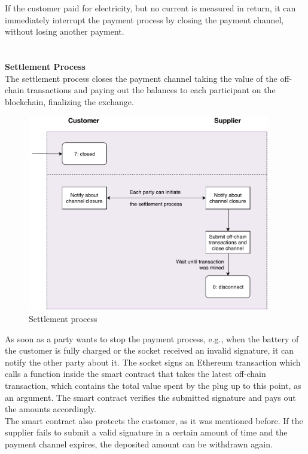 If the customer paid for electricity, but no current is measured in return, it can immediately interrupt the payment process by closing the payment channel, without losing another payment.
\\\\\\
\textbf{Settlement Process}\\
The settlement process closes the payment channel taking the value of the off-chain transactions and paying out the balances to each participant on the blockchain, finalizing the exchange.
\begin{figure}[H]
  \begin{center}
    \includegraphics[height=8.6cm]{img/Plug-Socket-settlement_process.pdf}
    \caption{Settlement process}
    \label{fig:settlement_process}
  \end{center}
\end{figure}
As soon as a party wants to stop the payment process, e.g., when the battery of the customer is fully charged or the socket received an invalid signature, it can notify the other party about it.
The socket signs an Ethereum transaction which calls a function inside the smart contract that takes the latest off-chain transaction, which contains the total value spent by the plug up to this point, as an argument.
The smart contract verifies the submitted signature and pays out the amounts accordingly.
\\
The smart contract also protects the customer, as it was mentioned before.
If the supplier fails to submit a valid signature in a certain amount of time and the payment channel expires, the deposited amount can be withdrawn again.
\\
